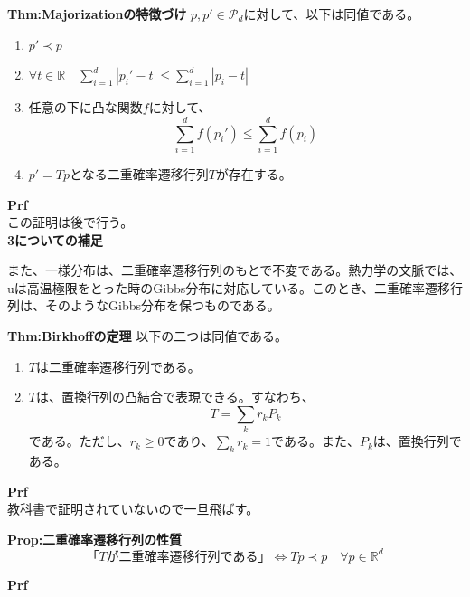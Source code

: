 \documentclass[a4paper,11pt]{jsarticle}
\numberwithin{equation}{section}
\begin{document}
\begin{itembox}[l]{\textbf{Thm:Majorizationの特徴づけ}}
    $p,p' \in \mathcal{P}_d$に対して、以下は同値である。
    \begin{enumerate}
        \item $p' \prec p$
        \item $\forall t\in \mathbb{R} \quad \sum_{i=1}^{d}|p_i'-t| \leq \sum_{i=1}^{d}|p_i-t|$
        \item 任意の下に凸な関数$f$に対して、
        \begin{equation}
            \sum_{i=1}^{d}f(p_i') \leq \sum_{i=1}^{d}f(p_i)
        \end{equation}
        \item $p' = Tp$となる二重確率遷移行列$T$が存在する。
    \end{enumerate}
\end{itembox}
\textbf{Prf}\\
この証明は後で行う。\\

\textbf{3についての補足}

また、一様分布は、二重確率遷移行列のもとで不変である。熱力学の文脈では、uは高温極限をとった時のGibbs分布に対応している。このとき、二重確率遷移行列は、そのようなGibbs分布を保つものである。\\

\begin{itembox}[l]{\textbf{Thm:Birkhoffの定理}}
    以下の二つは同値である。
    \begin{enumerate}
        \item $T$は二重確率遷移行列である。
        \item $T$は、置換行列の凸結合で表現できる。すなわち、
        \begin{equation}
            T = \sum_{k} r_k P_k
        \end{equation}
        である。ただし、$r_k \geq 0$であり、$\sum_k r_k = 1$である。また、$P_k$は、置換行列である。
    \end{enumerate}
\end{itembox}
\textbf{Prf}\\
教科書で証明されていないので一旦飛ばす。\\

\begin{itembox}[l]{\textbf{Prop:二重確率遷移行列の性質}}
    \begin{equation}
        「Tが二重確率遷移行列である」 \Leftrightarrow Tp \prec p \quad \forall p \in \mathbb{R}^d
    \end{equation}
\end{itembox}
\textbf{Prf}\\
\end{document}
